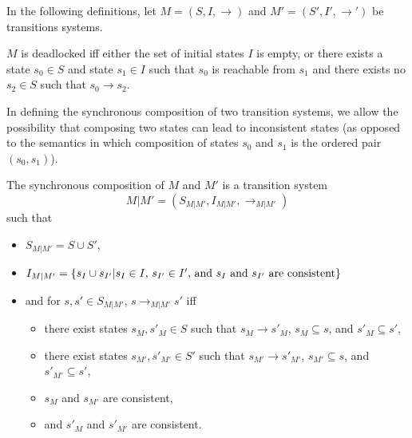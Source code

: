 \documentclass{llncs/llncs}
\begin{document}
In the following definitions, let
$M = (S, I, \rightarrow)$
and
$M' = (S', I', \rightarrow')$
be transitions systems.

\begin{definition}[Deadlock]
$M$ is deadlocked iff either the set of initial states $I$ is empty, or there exists a state $s_0 \in S$ and state $s_1 \in I$ such that $s_0$ is reachable from $s_1$ and there exists no $s_2 \in S$ such that $s_0 \rightarrow s_2$.
\end{definition}


In defining the synchronous composition of two transition systems, we allow the possibility that composing two states can lead to inconsistent states (as opposed to the semantics in which composition of states $s_0$ and $s_1$ is the ordered pair $(s_0, s_1)$).

\begin{definition}
The synchronous composition of $M$ and $M'$ is a transition system
$$M | M' = (S_{M | M'}, I_{M | M'}, \rightarrow_{M | M'})$$
\noindent
such that
\begin{itemize}
\item $S_{M | M'} = S \cup S'$,
\item $I_{M | M'} = \{ s_I \cup s_{I'} | s_I \in I\textnormal{, }s_{I'} \in I'\textnormal{, and } s_I \textnormal{ and } s_{I'}\textnormal{ are consistent}\}$
\item and for $s, s' \in S_{M | M'}$, $s \rightarrow_{M | M'} s'$ iff
  \begin{itemize}
  \item there exist states $s_M, s'_M \in S$ such that $s_M \rightarrow s'_M$, $s_M \subseteq s$, and $s'_M \subseteq s'$,
  \item there exist states $s_{M'}, s'_{M'} \in S'$ such that $s_{M'} \rightarrow s'_{M'}$, $s_{M'} \subseteq s$, and $s'_{M'} \subseteq s'$,
  \item $s_M$ and $s_{M'}$ are consistent,
  \item and $s'_M$ and $s'_{M'}$ are consistent.
  \end{itemize}
\end{itemize}
\end{definition}
\end{document}
